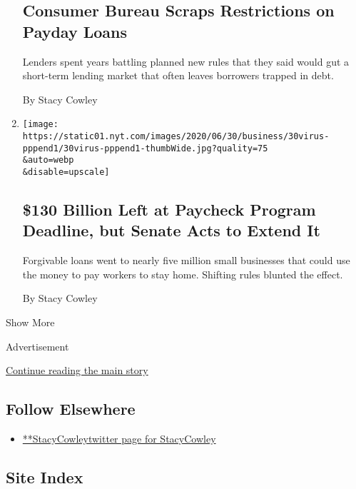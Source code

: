 \begin{enumerate}
{  \subsection{Consumer Bureau Scraps Restrictions on Payday
  Loans}\label{consumer-bureau-scraps-restrictions-on-payday-loans}}

  Lenders spent years battling planned new rules that they said would
  gut a short-term lending market that often leaves borrowers trapped in
  debt.

  By Stacy Cowley
\item
  \href{/2020/06/30/business/paycheck-protection-program-coronavirus.html}{}

  \texttt{[image: https://static01.nyt.com/images/2020/06/30/business/30virus-pppend1/30virus-pppend1-thumbWide.jpg?quality=75\\\&auto=webp\\\&disable=upscale]}

  \hypertarget{130-billion-left-at-paycheck-program-deadline-but-senate-acts-to-extend-it}{%
  \subsection{\$130 Billion Left at Paycheck Program Deadline, but
  Senate Acts to Extend
  It}\label{130-billion-left-at-paycheck-program-deadline-but-senate-acts-to-extend-it}}

  Forgivable loans went to nearly five million small businesses that
  could use the money to pay workers to stay home. Shifting rules
  blunted the effect.

  By Stacy Cowley
\end{enumerate}

Show More

Advertisement

\protect\hyperlink{after-mid2}{Continue reading the main story}

\hypertarget{follow-elsewhere}{%
\subsection{Follow Elsewhere}\label{follow-elsewhere}}

\begin{itemize}
\tightlist
\item
  \href{https://twitter.com/StacyCowley}{**StacyCowleytwitter page for
  StacyCowley}
\end{itemize}

\hypertarget{site-index}{%
\subsection{Site Index}\label{site-index}}

